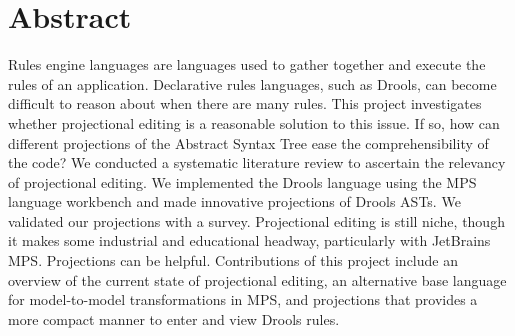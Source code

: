 \chapter*{Abstract}

Rules engine languages are languages used to gather together and execute the rules of an application.
Declarative rules languages, such as Drools, can become difficult to reason about when there are many rules.
This project investigates whether projectional editing is a reasonable solution to this issue.
If so, how can different projections of the Abstract Syntax Tree ease the comprehensibility of the code?
We conducted a systematic literature review to ascertain the relevancy of projectional editing.
We implemented the Drools language using the MPS language workbench and made innovative projections of Drools ASTs.
We validated our projections with a survey. 
Projectional editing is still niche, though it makes some industrial and educational headway, particularly with JetBrains MPS. 
Projections can be helpful.  
Contributions of this project include an overview of the current state of projectional editing, an alternative base language for model-to-model transformations in MPS, and projections that provides a more compact manner to enter and view Drools rules. 
